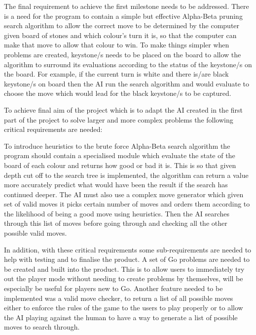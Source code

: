 \documentclass{l4proj}
\begin{document}
The final requirement to achieve the first milestone needs to be addressed. There is a need for the program to contain a simple but effective Alpha-Beta pruning search algorithm to allow the correct move to be determined by the computer given board of stones and which colour’s turn it is, so that the computer can make that move to allow that colour to win. To make things simpler when problems are created, keystone/s needs to be placed on the board to allow the algorithm to surround its evaluations according to the status of the keystone/s on the board. For example, if the current turn is white and there is/are black keystone/s on board then the AI run the search algorithm and would evaluate to choose the move which would lead for the black keystone/s to be captured.

To achieve final aim of the project which is to adapt the AI created in the first part of the project to solve larger and more complex problems the following critical requirements are needed:

To introduce heuristics to the brute force Alpha-Beta search algorithm the program should contain a specialised module which evaluate the state of the board of each colour and returns how good or bad it is. This is so that given depth cut off to the search tree is implemented, the algorithm can return a value more accurately predict what would have been the result if the search has continued deeper. The AI must also use a complex move generator which given set of valid moves it picks certain number of moves and orders them according to the likelihood of being a good move using heuristics. Then the AI searches through this list of moves before going through and checking all the other possible valid moves.

In addition, with these critical requirements some sub-requirements are needed to help with testing and to finalise the product. A set of Go problems are needed to be created and built into the product. This is to allow users to immediately try out the player mode without needing to create problems by themselves, will be especially be useful for players new to Go. Another feature needed to be implemented was a valid move checker, to return a list of all possible moves either to enforce the rules of the game to the users to play properly or to allow the AI playing against the human to have a way to generate a list of possible moves to search through.
\end{document}
